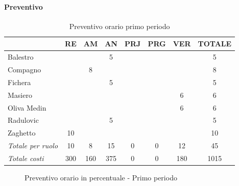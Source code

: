 \documentclass[a4paper,12pt]{article}
\begin{document}
            \paragraph{Preventivo}
                \begin{table}[H]
                \centering
                \caption{Preventivo orario primo periodo}
                \begin{tabular}{|l|c|c|c|c|c|c|c|}
                \hline
                    \rowcolor{lightgray}{\textbf{Membro}} & {\textbf{RE}} & {\textbf{AM}} & {\textbf{AN}} & {\textbf{PRJ}} & {\textbf{PRG}} & {\textbf{VER}} & {\textbf{TOTALE}}\\
                \hline
                    Balestro & & & 5 & & & & 5\\
                \hline
                    Compagno & & 8 & & & & & 8\\
                \hline
                    Fichera & & & 5 & & & & 5\\
                \hline
                    Masiero & & & & & & 6 & 6\\
                \hline
                    Oliva Medin & & & & & & 6 & 6\\
                \hline
                    Radulovic & & & 5 & & & & 5\\
                \hline
                    Zaghetto & 10 & & & & & & 10\\
                \hline
                    \rowcolor{lightgray}\textit{Totale per ruolo} & 10 & 8 & 15 & 0 & 0 & 12 & 45\\
                \hline
                    \rowcolor{lightgray}\textit{Totale costi} & 300 & 160 & 375 & 0 & 0 & 180 & 1015\\
                \hline
                \end{tabular}
                \end{table}

                \begin{figure}[H]
                \centering
                \caption{Preventivo orario in percentuale - Primo periodo}
                \end{figure}
        
\end{document}
